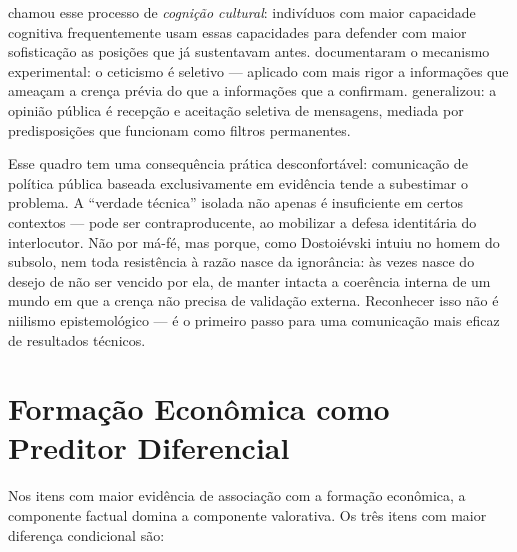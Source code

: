  chamou esse processo de \textit{cognição cultural}: indivíduos com maior capacidade cognitiva frequentemente usam essas capacidades para defender com maior sofisticação as posições que já sustentavam antes.  documentaram o mecanismo experimental: o ceticismo é seletivo — aplicado com mais rigor a informações que ameaçam a crença prévia do que a informações que a confirmam.  generalizou: a opinião pública é recepção e aceitação seletiva de mensagens, mediada por predisposições que funcionam como filtros permanentes.

Esse quadro tem uma consequência prática desconfortável: comunicação de política pública baseada exclusivamente em evidência tende a subestimar o problema. A ``verdade técnica'' isolada não apenas é insuficiente em certos contextos — pode ser contraproducente, ao mobilizar a defesa identitária do interlocutor. Não por má-fé, mas porque, como Dostoiévski intuiu no homem do subsolo, nem toda resistência à razão nasce da ignorância: às vezes nasce do desejo de não ser vencido por ela, de manter intacta a coerência interna de um mundo em que a crença não precisa de validação externa. Reconhecer isso não é niilismo epistemológico — é o primeiro passo para uma comunicação mais eficaz de resultados técnicos.

\section{Formação Econômica como Preditor Diferencial}
\label{sec:formacao-calibragem}

Nos itens com maior evidência de associação com a formação econômica, a componente factual domina a componente valorativa. Os três itens com maior diferença condicional são:

